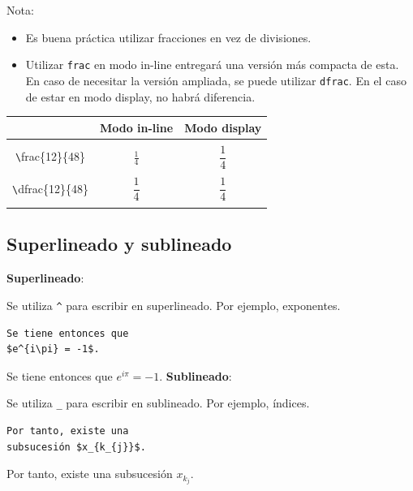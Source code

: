 \documentclass[../notes.tex]{subfiles}
\begin{document}
        Nota:
            \begin{itemize}
                \item Es buena práctica utilizar fracciones en vez de divisiones.
                \item Utilizar \texttt{frac} en modo in-line entregará una versión más compacta de esta. En caso de necesitar la versión ampliada, se puede utilizar \texttt{dfrac}. En el caso de estar en modo display, no habrá diferencia.
            \end{itemize}
        \begin{center}
           \begin{tabular}{|c|c|c|}
             \hline
                 & Modo in-line & Modo display\\
            \hline
                & & \\
                 \texttt \textbackslash frac\{12\}\{48\} & $\quad\quad\frac{1}{4}\quad\quad$ & $\quad\quad\dfrac{1}{4}\quad\quad$ \\
                        & & \\
                \texttt \textbackslash dfrac\{12\}\{48\} & $\quad\quad\dfrac{1}{4}\quad\quad$ & $\quad\quad\dfrac{1}{4}\quad\quad$ \\
                        & & \\
              \hline
          \end{tabular}
        \end{center}

    \subsection{Superlineado y sublineado}

            \textbf{Superlineado}: 

                Se utiliza \texttt{\^} para escribir en superlineado. Por ejemplo, exponentes.

                \begin{verbatim}
Se tiene entonces que 
$e^{i\pi} = -1$.
                \end{verbatim}
Se tiene entonces que $e^{i\pi} = -1$.
                \textbf{Sublineado}: 

                Se utiliza \texttt{\_} para escribir en sublineado. Por ejemplo, índices.

                \begin{verbatim}
Por tanto, existe una
subsucesión $x_{k_{j}}$.
                \end{verbatim}
Por tanto, existe una subsucesión $x_{k_{j}}$.
    
\end{document}
